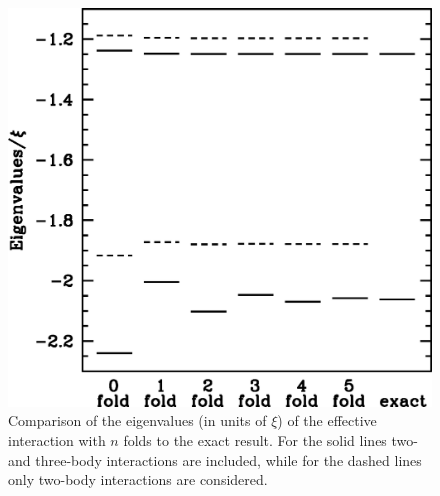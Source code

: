\documentclass[prc,aps,amsmath,amssymb,preprintnumbers,showpacs,twocolumn]{revtex4}
\begin{document}
%
\begin{figure}[t]
 \includegraphics[width=7truecm]{fig5.eps}
\caption{Comparison of the eigenvalues (in units of $\xi$) of the 
effective interaction with $n$ folds to the exact result. For the  
solid lines two- and three-body interactions are included, while 
for the dashed lines only two-body interactions are considered.} 
\label{f5}
\end{figure}
%
\end{document}
